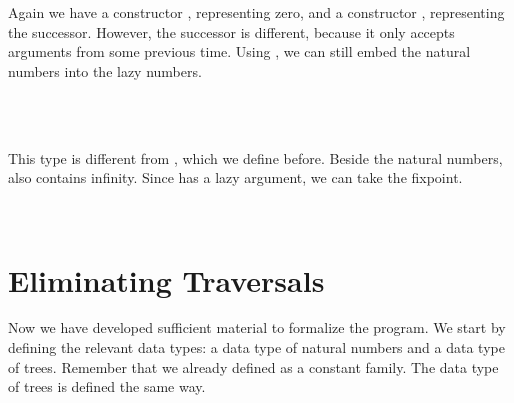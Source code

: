 Again we have a constructor , representing zero, and a constructor , representing the successor.
However, the successor is different, because it only accepts arguments from some previous time.
Using , we can still embed the natural numbers into the lazy numbers.

\begin{code}%
\>[0]\AgdaSpace{}%
\AgdaSymbol{:}\AgdaSpace{}%
\AgdaSpace{}%
\AgdaSpace{}%
\AgdaSpace{}%
\<%
\\
\>[0]\AgdaSpace{}%
\AgdaSpace{}%
\AgdaSymbol{=}\AgdaSpace{}%
\<%
\\
\>[0]\AgdaSpace{}%
\AgdaSymbol{(}\AgdaSpace{}%
\AgdaSymbol{)}\AgdaSpace{}%
\AgdaSymbol{=}\AgdaSpace{}%
\AgdaSpace{}%
\AgdaSymbol{(}\AgdaSpace{}%
\AgdaSymbol{(}\AgdaSpace{}%
\AgdaSymbol{))}\<%
\end{code}

This type is different from , which we define before.
Beside the natural numbers,  also contains infinity.
Since  has a lazy argument, we can take the fixpoint.

\begin{code}%
\>[0]\AgdaSpace{}%
\AgdaSymbol{:}\AgdaSpace{}%
\AgdaSpace{}%
\<%
\\
\>[0]\AgdaSpace{}%
\AgdaSymbol{=}\AgdaSpace{}%
\AgdaSpace{}%
\<%
\end{code}

\section{Eliminating Traversals}
Now we have developed sufficient material to formalize the program.
We start by defining the relevant data types: a data type of natural numbers and a data type of trees.
Remember that we already defined  as a constant family.
The data type of trees is defined the same way.

